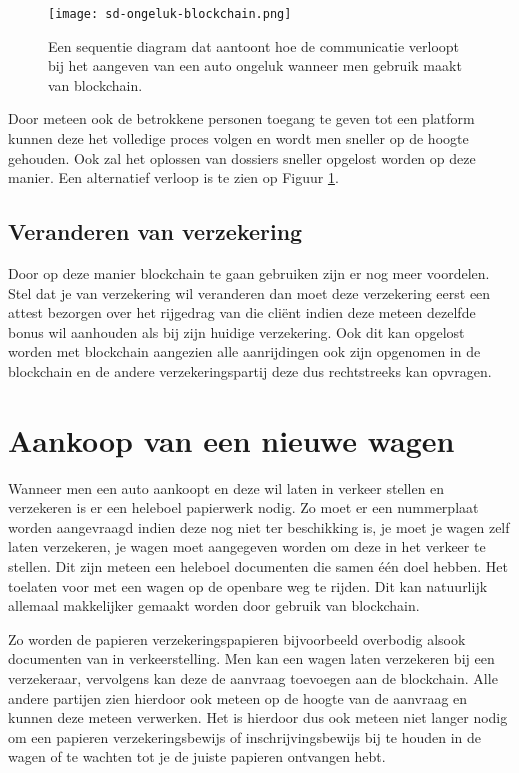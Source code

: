 \begin{figure}
	\texttt{[image: sd-ongeluk-blockchain.png]}
	\caption{Een sequentie diagram dat aantoont hoe de communicatie verloopt bij het aangeven van een auto ongeluk wanneer men gebruik maakt van blockchain.}
	\label{fig:accident-blockchain}
\end{figure}

Door meteen ook de betrokkene personen toegang te geven tot een platform kunnen deze het volledige proces volgen en wordt men sneller op de hoogte gehouden. Ook zal het oplossen van dossiers sneller opgelost worden op deze manier. Een alternatief verloop is te zien op Figuur \ref{fig:accident-blockchain}.

\subsection{Veranderen van verzekering}
Door op deze manier blockchain te gaan gebruiken zijn er nog meer voordelen. Stel dat je van verzekering wil veranderen dan moet deze verzekering eerst een attest bezorgen over het rijgedrag van die cliënt indien deze meteen dezelfde bonus wil aanhouden als bij zijn huidige verzekering. Ook dit kan opgelost worden met blockchain aangezien alle aanrijdingen ook zijn opgenomen in de blockchain en de andere verzekeringspartij deze dus rechtstreeks kan opvragen. 

\section{Aankoop van een nieuwe wagen}
Wanneer men een auto aankoopt en deze wil laten in verkeer stellen en verzekeren is er een heleboel papierwerk nodig. Zo moet er een nummerplaat worden aangevraagd indien deze nog niet ter beschikking is, je moet je wagen zelf laten verzekeren, je wagen moet aangegeven worden om deze in het verkeer te stellen. Dit zijn meteen een heleboel documenten die samen één doel hebben. Het toelaten voor met een wagen op de openbare weg te rijden. Dit kan natuurlijk allemaal makkelijker gemaakt worden door gebruik van blockchain. 

Zo worden de papieren verzekeringspapieren bijvoorbeeld overbodig alsook documenten van in verkeerstelling. Men kan een wagen laten verzekeren bij een verzekeraar, vervolgens kan deze de aanvraag toevoegen aan de blockchain. Alle andere partijen zien hierdoor ook meteen op de hoogte van de aanvraag en kunnen deze meteen verwerken. Het is hierdoor dus ook meteen niet langer nodig om een papieren verzekeringsbewijs of inschrijvingsbewijs bij te houden in de wagen of te wachten tot je de juiste papieren ontvangen hebt.

